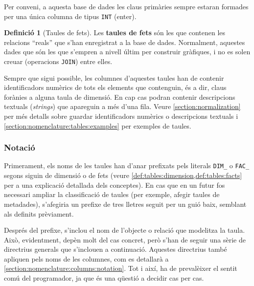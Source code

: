 \documentclass{article}
\theoremstyle{definition}
\newtheorem{definition}{Definició}
\begin{document}
Per conveni, a aquesta base de dades les claus primàries sempre estaran formades per una única columna de tipus \verb|INT| (enter). 

\begin{definition}[Taules de fets]\label{def:tables:facts}
  Les \textbf{taules de fets} són les que contenen les relacions ``reals'' que s'han enregistrat a la base de dades. Normalment, aquestes dades que són les que s'empren a nivell últim per construir gràfiques, i no es solen creuar (operacions \verb|JOIN|) entre elles.
\end{definition}

Sempre que sigui possible, les columnes d'aquestes taules han de contenir identificadors numèrics de tots els elements que contenguin, és a dir, claus forànies a alguna taula de dimensió. En cap cas podran contenir descripcions textuals (\emph{strings}) que apareguin a més d'una fila. Veure \cref{section:normalization} per més detalls sobre guardar identificadors numèrics o descripcions textuals i \cref{section:nomenclature:tables:examples} per exemples de taules.

\subsubsection{Notació}\label{section:nomenclature:tables:notation}
Primerament, els noms de les taules han d'anar prefixats pels literals \verb|DIM_| o \verb|FAC_| segons siguin de dimensió o de fets (veure \cref{def:tables:dimension,def:tables:facts} per a una explicació detallada dels conceptes). En cas que en un futur fos necessari ampliar la classificació de taules (per exemple, afegir taules de metadades), s'afegiria un prefixe de tres lletres seguit per un guió baix, semblant als definits prèviament.

Després del prefixe, s'inclou el nom de l'objecte o relació que modelitza la taula. Això, evidentment, depèn molt del cas concret, però s'han de seguir una sèrie de directrius generals que s'inclouen a continuació. Aquestes directrius també apliquen pels noms de les columnes, com es detallarà a \ref{section:nomenclature:columns:notation}. Tot i així, ha de prevalèixer el sentit comú del programador, ja que és una qüestió a decidir cas per cas.
\end{document}
